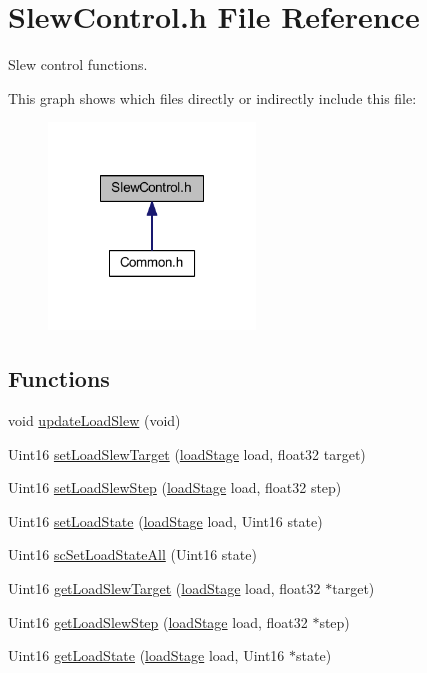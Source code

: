 \hypertarget{a00049}{\section{Slew\-Control.\-h File Reference}
\label{a00049}
}


Slew control functions.  


This graph shows which files directly or indirectly include this file\-:\nopagebreak
\begin{figure}[H]
\begin{center}
\leavevmode
\includegraphics[width=156pt]{a00077}
\end{center}
\end{figure}
\subsection*{Functions}
\begin{DoxyCompactItemize}
\item 
void \hyperlink{a00049_a781fe23cb47009003e6d7b8343a377fa}{update\-Load\-Slew} (void)
\item 
Uint16 \hyperlink{a00049_af91ad2be323d5d0c10e6127418690811}{set\-Load\-Slew\-Target} (\hyperlink{a00027_a2820f1e18d921d2f1e97d53404b9fbae}{load\-Stage} load, float32 target)
\item 
Uint16 \hyperlink{a00049_ae38c51e6a504a6fd7a77edb6a3a06656}{set\-Load\-Slew\-Step} (\hyperlink{a00027_a2820f1e18d921d2f1e97d53404b9fbae}{load\-Stage} load, float32 step)
\item 
Uint16 \hyperlink{a00049_a567e736b557aa3dd69472d13f96ea006}{set\-Load\-State} (\hyperlink{a00027_a2820f1e18d921d2f1e97d53404b9fbae}{load\-Stage} load, Uint16 state)
\item 
Uint16 \hyperlink{a00049_a68d48d3f3c783662c131f2407f9e8792}{sc\-Set\-Load\-State\-All} (Uint16 state)
\item 
Uint16 \hyperlink{a00049_a90d0ebd5af992cd41a3fd3878e3d9b5a}{get\-Load\-Slew\-Target} (\hyperlink{a00027_a2820f1e18d921d2f1e97d53404b9fbae}{load\-Stage} load, float32 $\ast$target)
\item 
Uint16 \hyperlink{a00049_a33909c7bbfa64f91ef2257ecc97a8d7b}{get\-Load\-Slew\-Step} (\hyperlink{a00027_a2820f1e18d921d2f1e97d53404b9fbae}{load\-Stage} load, float32 $\ast$step)
\item 
Uint16 \hyperlink{a00049_af470a5cd45bfe44d75f6a314c45c256c}{get\-Load\-State} (\hyperlink{a00027_a2820f1e18d921d2f1e97d53404b9fbae}{load\-Stage} load, Uint16 $\ast$state)
\end{DoxyCompactItemize}


